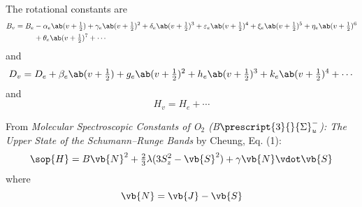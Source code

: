 \documentclass[11pt, twoside, fleqn]{report}
\newcommand{\state}[2]{\prescript{#1}{}{#2}}
\begin{document}
The rotational constants are
\begin{align*}
    B_{v} = B_{e} & - \alpha_{e}\ab(v + \tfrac{1}{2}) + \gamma_{e}\ab(v + \tfrac{1}{2})^{2} + \delta_{e}\ab(v + \tfrac{1}{2})^{3} + \varepsilon_{e}\ab(v + \tfrac{1}{2})^{4} + \xi_{e}\ab(v + \tfrac{1}{2})^{5} + \eta_{e}\ab(v + \tfrac{1}{2})^{6} \\
                  & + \theta_{e}\ab(v + \tfrac{1}{2})^{7} + \dotsb
\end{align*}
and
\begin{equation*}
    D_{v} = D_{e} + \beta_{e}\ab(v + \tfrac{1}{2}) + g_{e}\ab(v + \tfrac{1}{2})^{2} + h_{e}\ab(v + \tfrac{1}{2})^{3} + k_{e}\ab(v + \tfrac{1}{2})^{4} + \dotsb
\end{equation*}
and
\begin{equation*}
    H_{v} = H_{e} + \dotsb
\end{equation*}

From \textit{Molecular Spectroscopic Constants of O$_{2}$ (B$\state{3}{\Sigma}^{-}_{u}$): The Upper State of the Schumann--Runge Bands} by Cheung, Eq. (1):
\begin{equation*}
    \sop{H} = B\vb{N}^{2} + \tfrac{2}{3}\lambda(3S_{z}^{2} - \vb{S}^{2}) + \gamma\vb{N}\vdot\vb{S}
\end{equation*}
where
\begin{equation*}
    \vb{N} = \vb{J} - \vb{S}
\end{equation*}
\end{document}
